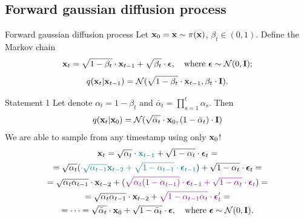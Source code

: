 \subsection{Forward gaussian diffusion process}
\begin{frame}{Forward gaussian diffusion process}
	Let $\mathbf{x}_0 = \mathbf{x} \sim \pi(\mathbf{x})$, $\beta_t \in (0, 1)$. Define the Markov chain
	\[
		\mathbf{x}_t = \sqrt{1 - \beta_t} \cdot \mathbf{x}_{t - 1} + \sqrt{\beta_t} \cdot \boldsymbol{\epsilon}, \quad \text{where }\boldsymbol{\epsilon} \sim \mathcal{N}(0, \mathbf{I});
	\]
	\[
		q(\mathbf{x}_t | \mathbf{x}_{t-1}) = \mathcal{N}(\sqrt{1 - \beta_t} \cdot \mathbf{x}_{t-1}, \beta_t \cdot \mathbf{I}).
	\]
	\vspace{-0.5cm}
	\begin{block}{Statement 1}
		Let denote $\alpha_t = 1 - \beta_t$ and $\bar{\alpha}_t = \prod_{s=1}^t \alpha_s$. Then
		\[
			q(\mathbf{x}_t | \mathbf{x}_0) = \mathcal{N}(\sqrt{\bar{\alpha}_t} \cdot \mathbf{x}_0, (1 - \bar{\alpha}_t) \cdot \mathbf{I})
		\]
		We are able to sample from any timestamp using only $\mathbf{x}_0$!
		\vspace{-0.2cm}
		{\small
		\begin{multline*}
			\mathbf{x}_t = \sqrt{\alpha_t} \cdot {\color{teal}\mathbf{x}_{t-1}} + \sqrt{1 - \alpha_t} \cdot \boldsymbol{\epsilon}_t = \\
			= \sqrt{\alpha_t} ({\color{teal} \cdot \sqrt{\alpha_{t-1}} \mathbf{x}_{t-2} + \sqrt{1 - \alpha_{t-1}} \cdot  \boldsymbol{\epsilon}_{t-1}}) + \sqrt{1 - \alpha_t} \cdot \boldsymbol{\epsilon}_t = \\
			= \sqrt{\alpha_t \alpha_{t-1}} \cdot \mathbf{x}_{t-2} + ( {\color{violet}\sqrt{\alpha_t (1 - \alpha_{t-1})} \cdot  \boldsymbol{\epsilon}_{t-1} + \sqrt{1 - \alpha_t} \cdot \boldsymbol{\epsilon}_t}) = \\
			= \sqrt{\alpha_t \alpha_{t-1}} \cdot \mathbf{x}_{t-2} + {\color{violet}\sqrt{1 - \alpha_{t-1} \alpha_t} \cdot \boldsymbol{\epsilon}'_t} = \\
			 = \dots = \sqrt{\bar{\alpha}_t} \cdot \mathbf{x}_{0} + \sqrt{1 - \bar{\alpha}_t} \cdot \boldsymbol{\epsilon}, \quad \text{where } \boldsymbol{\epsilon} \sim \mathcal{N}(0, \mathbf{I}).
		\end{multline*}
		}
	\end{block}
 \end{frame}
